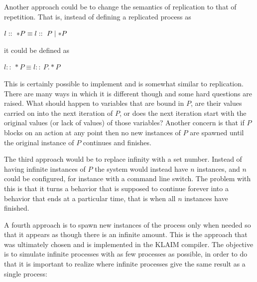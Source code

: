 	Another approach could be to change the semantics of replication
	to that of repetition. That is, instead of defining a replicated
	process as
	\begin{center}$l ::\ *P  \equiv l ::\ P \mid *P$\end{center}
	it could be defined as
	\begin{center}$l ::\ *P  \equiv l ::\ P .* P$\end{center}
	This is certainly possible to implement and is somewhat similar to 
	replication. There are many ways in which it is different though and
	some hard questions are raised. What should happen to variables that
	are bound in $P$, are their values carried on into the next iteration of 
	$P$, or does the next iteration start with the original values (or lack
	of values) of those variables? Another concern is that if $P$ blocks on
	an action at any point then no new instances of $P$ are spawned until the
	original instance of $P$ continues and finishes. 
		
	The third approach would be to replace infinity with a set number. Instead
	of having infinite instances of $P$ the system would instead have $n$ 
	instances, and $n$ could be configured, for instance with a command line 
	switch. The problem with this is that it turns a behavior that is supposed
	to continue forever into a behavior that ends at a particular time, that is 
	when all $n$ instances have finished.
	
	A fourth approach is to spawn new instances of the process only 
	when needed so that it appears as though there is an infinite amount. This
	is the approach that was ultimately chosen and is implemented in the KLAIM
	compiler. The objective is to simulate infinite processes with as few 
	processes as possible, in order to do that it is important to realize where
	infinite processes give the same result as a single process:
	
